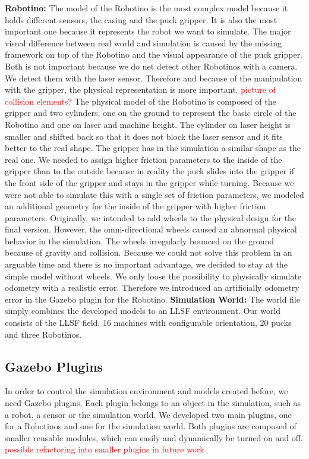 \textbf{Robotino:} The model of the Robotino is the most complex model because it holds different sensors, the casing and the puck gripper. It is also the most important one because it represents the robot we want to simulate. The major visual difference between real world and simulation is caused by the missing framework on top of the Robotino and the visual appearance of the puck gripper. Both is not important because we do net detect other Robotinos with a camera. We detect them with the laser sensor. Therefore and because of the manipulation with the gripper, the physical representation is more important. \textcolor{red}{picture of collision elements?} The physical model of the Robotino is composed of the gripper and two cylinders, one on the ground to represent the basic circle of the Robotino and one on laser and machine height. The cylinder on laser height is smaller and shifted back so that it does not block the laser sensor and it fits better to the real shape. The gripper has in the simulation a similar shape as the real one. We needed to assign higher friction parameters to the inside of the gripper than to the outside because in reality the puck slides into the gripper if the front side of the gripper and stays in the gripper while turning. Because we were not able to simulate this with a single set of friction parameters, we modeled an additional geometry for the inside of the gripper with higher friction parameters. Originally, we intended to add wheels to the physical design for the final version. However, the omni-directional wheels caused an abnormal physical behavior in the simulation. The wheels irregularly bounced on the ground because of gravity and collision. Because we could not solve this problem in an arguable time and there is no important advantage, we decided to stay at the simple model without wheels. We only loose the possibility to physically simulate odometry with a realistic error. Therefore we introduced an artificially odometry error in the Gazebo plugin for the Robotino.
\textbf{Simulation World:} The world file simply combines the developed models to an LLSF environment. Our world consists of the LLSF field, 16 machines with configurable orientation, 20 pucks and three Robotinos.\\


\subsection{Gazebo Plugins}
In order to control the simulation environment and models created before, we need Gazebo plugins. Each plugin belongs to an object in the simulation, such as a robot, a sensor or the simulation world. We developed two main plugins, one for a Robotinos and one for the simulation world. Both plugins are composed of smaller reusable modules, which can easily and dynamically be turned on and off. \textcolor{red}{possible refactoring into smaller plugins in future work}

